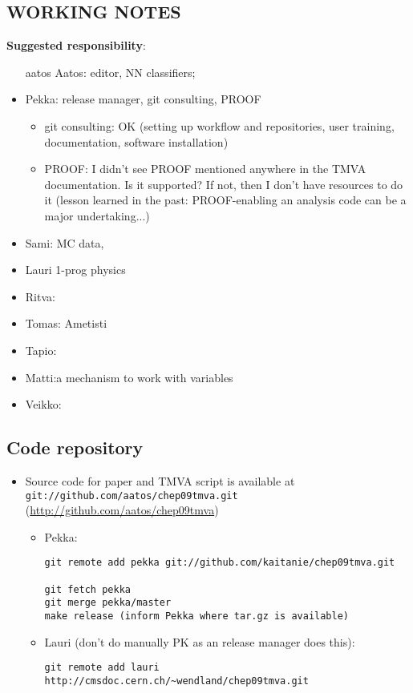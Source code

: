 \begin{appendix}
\section{WORKING NOTES}
{\bf Suggested  responsibility}: 
\begin{itemize}
\item[aatos]
Aatos: editor, NN classifiers; 
\item Pekka: release manager, git consulting, PROOF
\begin{itemize}
\item git consulting: OK (setting up workflow and repositories, user
  training, documentation, software installation)
\item PROOF: I didn't see PROOF mentioned anywhere in the TMVA
  documentation. Is it supported? If not, then I don't have resources
  to do it (lesson learned in the past: PROOF-enabling an analysis
  code can be a major undertaking...)
\end{itemize}
\item Sami: MC data, 
\item Lauri 1-prog physics
\item Ritva: 
\item Tomas: Ametisti
\item Tapio: 
\item Matti:a mechanism to work with variables 
\item Veikko:
\end{itemize}

\subsection{Code repository}
\begin{itemize}
\item Source code for paper and TMVA script  is available at 
{\tt git://github.com/aatos/chep09tmva.git} (\url{http://github.com/aatos/chep09tmva})
\begin{itemize}
\item Pekka:
\begin{verbatim}
git remote add pekka git://github.com/kaitanie/chep09tmva.git

git fetch pekka
git merge pekka/master
make release (inform Pekka where tar.gz is available)
\end{verbatim}

\item Lauri (don't do manually PK as an release manager does this):
\begin{verbatim}
git remote add lauri http://cmsdoc.cern.ch/~wendland/chep09tmva.git


\end{verbatim}
\end{itemize}
\end{itemize}
\end{appendix}
